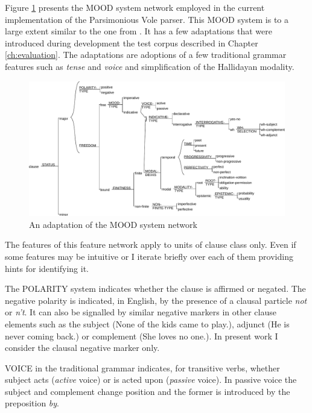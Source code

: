     Figure \ref{fig:clause-mood} presents the MOOD system network employed in the current implementation of the Parsimonious Vole parser. This MOOD system is to a large extent similar to the one from \citet[162]{Halliday2013}. It has a few adaptations that were introduced during development the test corpus described in Chapter \ref{ch:evaluation}. The adaptations are adoptions of a few traditional grammar features such as \textit{tense} and \textit{voice} and simplification of the Hallidayan modality.
        
    \begin{figure}[!ht]
        \centering
        \includegraphics[width=\linewidth]{Figures/SFL-grammar/mood-simplified.pdf}
        \caption{An adaptation of the MOOD system network \citep[162]{Halliday2013}}
        \label{fig:clause-mood}
    \end{figure}

    The features of this feature network apply to units of clause class only. Even if some features may be intuitive or I iterate briefly over each of them providing hints for identifying it. 
    
    The POLARITY system indicates whether the clause is affirmed or negated. The negative polarity is indicated, in English, by the presence of a clausal particle \textit{not} or \textit{n't}. It can also be signalled by similar negative markers in other clause elements such as the subject (None of the kids came to play.), adjunct (He is never coming back.) or complement (She loves no one.). In present work I consider the clausal negative marker only. 
    
    VOICE in the traditional grammar indicates, for transitive verbs, whether subject acts (\textit{active} voice) or is acted upon (\textit{passive} voice). In passive voice the subject and complement change position and the former is introduced by the preposition \textit{by}. 
    
